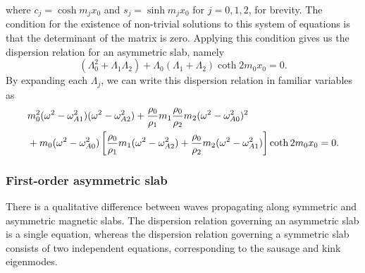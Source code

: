 \documentclass[12pt]{../style-files/ociamthesis}
\begin{document}
where $c_j = \cosh{m_jx_0}$ and $s_j = \sinh{m_jx_0}$ for $j=0,1,2$, for brevity. The condition for the existence of non-trivial solutions to this system of equations is that the determinant of the matrix is zero. Applying this condition gives us the dispersion relation for an asymmetric slab, namely
\begin{equation}
(\Lambda_0^2 + \Lambda_1\Lambda_2) + \Lambda_0(\Lambda_1 + \Lambda_2)\coth{2m_0x_0} = 0. \label{DR lambda}
\end{equation}
By expanding each $\Lambda_j$, we can write this dispersion relation in familiar variables as
\begin{align}
&m_0^2(\omega^2 - \omega_{A1}^2)(\omega^2 - \omega_{A2}^2) + \frac{\rho_0}{\rho_1}m_1\frac{\rho_0}{\rho_2}m_2(\omega^2 - \omega_{A0}^2)^2 \notag \\
& + m_0(\omega^2 - \omega_{A0}^2)\left[\frac{\rho_0}{\rho_1}m_1(\omega^2 - \omega_{A2}^2) + \frac{\rho_0}{\rho_2}m_2(\omega^2 - \omega_{A1}^2)\right]\coth{2m_0x_0} = 0. \label{DR}
\end{align}


\subsubsection{First-order asymmetric slab}

There is a qualitative difference between waves propagating along symmetric and asymmetric magnetic slabs. The dispersion relation governing an asymmetric slab is a single equation, whereas the dispersion relation governing a symmetric slab \citep{rob81a} consists of two independent equations, corresponding to the sausage and kink eigenmodes.
\end{document}
